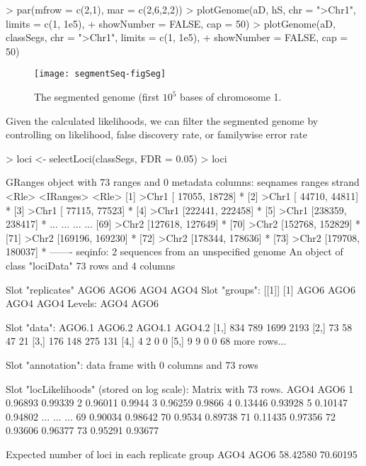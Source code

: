 \documentclass[a4paper]{article}
\begin{document}
\begin{Schunk}
\begin{Sinput}
> par(mfrow = c(2,1), mar = c(2,6,2,2))
> plotGenome(aD, hS, chr = ">Chr1", limits = c(1, 1e5),
+            showNumber = FALSE, cap = 50)
> plotGenome(aD, classSegs, chr = ">Chr1", limits = c(1, 1e5),
+            showNumber = FALSE, cap = 50)
\end{Sinput}
\end{Schunk}

\begin{figure}[!ht]
\begin{center}

\texttt{[image: segmentSeq-figSeg]}
\caption{The segmented genome (first $10^5$ bases of chromosome 1.}
\label{fig:Seg}
\end{center}
\end{figure}

Given the calculated likelihoods, we can filter the segmented genome by controlling on likelihood, false discovery rate, or familywise error rate

\begin{Schunk}
\begin{Sinput}
> loci <- selectLoci(classSegs, FDR = 0.05)
> loci
\end{Sinput}
\begin{Soutput}
GRanges object with 73 ranges and 0 metadata columns:
       seqnames           ranges strand
          <Rle>        <IRanges>  <Rle>
   [1]    >Chr1 [ 17055,  18728]      *
   [2]    >Chr1 [ 44710,  44811]      *
   [3]    >Chr1 [ 77115,  77523]      *
   [4]    >Chr1 [222441, 222458]      *
   [5]    >Chr1 [238359, 238417]      *
   ...      ...              ...    ...
  [69]    >Chr2 [127618, 127649]      *
  [70]    >Chr2 [152768, 152829]      *
  [71]    >Chr2 [169196, 169230]      *
  [72]    >Chr2 [178344, 178636]      *
  [73]    >Chr2 [179708, 180037]      *
  -------
  seqinfo: 2 sequences from an unspecified genome
An object of class "lociData"
73 rows and 4 columns

Slot "replicates"
AGO6 AGO6 AGO4 AGO4
Slot "groups":
[[1]]
[1] AGO6 AGO6 AGO4 AGO4
Levels: AGO4 AGO6


Slot "data":
     AGO6.1 AGO6.2 AGO4.1 AGO4.2
[1,]    834    789   1699   2193
[2,]     73     58     47     21
[3,]    176    148    275    131
[4,]      4      2      0      0
[5,]      9      9      0      0
68 more rows...

Slot "annotation":
data frame with 0 columns and 73 rows

Slot "locLikelihoods" (stored on log scale):
Matrix with  73  rows.
       AGO4    AGO6
1   0.96893 0.99339
2   0.96011  0.9944
3   0.96259  0.9866
4   0.13446 0.93928
5   0.10147 0.94802
...     ...     ...
69  0.90034 0.98642
70   0.9534 0.89738
71  0.11435 0.97356
72  0.93606 0.96377
73  0.95291 0.93677

Expected number of loci in each replicate group
    AGO4     AGO6 
58.42580 70.60195 
\end{Soutput}
\end{Schunk}
\end{document}
